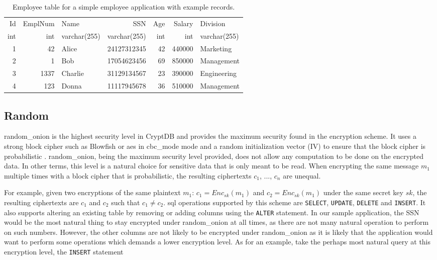 \begin{table}[H]
\centering
\begin{tabular}{| r | r | l | r | r | r | l |}
\hline
  Id & EmplNum & Name & SSN & Age & Salary & Division \\
  int & int & varchar(255) & varchar(255) & int & int & varchar(255) \\
 \hline \hline
 1 & 42 & Alice & 24127312345 & 42 & 440000 & Marketing \\
 2 & 1 & Bob & 17054623456 & 69 & 850000 & Management \\
 3 & 1337 & Charlie & 31129134567 & 23 & 390000 & Engineering \\
 4 & 123 & Donna & 11117945678 & 36 & 510000 & Management \\
 \hline

\end{tabular}
\caption{Employee table for a simple employee application with example records.}
\label{demoapp_table}
\end{table}



\subsection{Random}

\Gls{random_onion} is the highest security level in CryptDB and provides the maximum security found in the encryption scheme. It uses a strong block cipher such as Blowfish or \Gls{aes} in \Gls{cbc_mode} mode and a random initialization vector (IV) to ensure that the block cipher is probabilistic \citep{CryptDB_Main_Paper}. \Gls{random_onion}, being the maximum security level provided, does not allow any computation to be done on the encrypted data. In other terms, this level is a natural choice for sensitive data that is only meant to be read. When encrypting the same message $m_1$ multiple times with a block cipher that is probabilistic, the resulting ciphertexts $c_1$, $...$, $c_n$ are unequal. 

For example, given two encryptions of the same plaintext $m_1$: $c_1 = Enc_{sk}(m_1)$ and $c_2 = Enc_{sk}(m_1)$ under the same secret key $sk$, the resulting ciphertexts are $c_1$ and $c_2$ such that $c_1 \neq c_2$. \gls{sql} operations supported by this scheme are \verb!SELECT!, \verb!UPDATE!, \verb!DELETE! and \verb!INSERT!. It also supports altering an existing table by removing or adding columns using the \verb!ALTER! statement. In our sample application, the SSN would be the most natural thing to stay encrypted under \gls{random_onion} at all times, as there are not many natural operation to perform on such numbers. However, the other columns are not likely to be encrypted under \gls{random_onion} as it is likely that the application would want to perform some operations which demands a lower encryption level. As for an example, take the perhaps most natural query at this encryption level, the \verb!INSERT! statement

